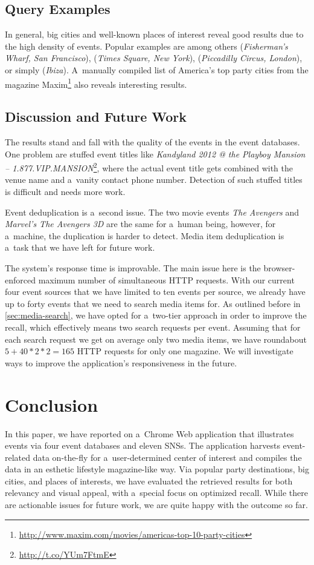 \documentclass{acm_proc_article-sp}
\let\oldemph\emph
\renewcommand{\emph}[1]{\oldemph{\fontsize{9}{9}\selectfont #1}}
\begin{document}
{\subsection{Query Examples}
In general, big cities and well-known places of interest
reveal good results due to the high density of events.
Popular examples are among others
(\emph{Fisherman's Wharf, San Francisco}),
(\emph{Times Square, New York}),
(\emph{Piccadilly Circus, London}),
or simply (\emph{Ibiza}).	
A~manually compiled list of America's top party cities
from the magazine Maxim\footnote{\url{http://www.maxim.com/movies/americas-top-10-party-cities}}
also reveals interesting results.

\subsection{Discussion and Future Work}
The results stand and fall with the quality of the events
in the event databases.
One problem are stuffed event titles like
\emph{Kandyland 2012 @ the Playboy Mansion -- 1.877.VIP.MANS\-ION}\footnote{\url{http://t.co/YUm7FtmE}},
where the actual event title gets combined with the venue name
and a~vanity contact phone number.
Detection of such stuffed titles is difficult and needs more work.

Event deduplication is a~second issue.
The two movie events \emph{The Avengers} and
\emph{Marvel's The Avengers 3D} are the same for a~human being,
however, for a~machine, the duplication is harder to detect.
Media item deduplication is a~task that we have left for future work.

The system's response time is improvable.
The main issue here is the browser-enforced maximum number
of simultaneous HTTP requests.
With our current four event sources that we have limited
to ten events per source, we already have up to forty events
that we need to search media items for.
As outlined before in \autoref{sec:media-search},
we have opted for a~two-tier approach in order to improve the recall,
which effectively means two search requests per event.
Assuming that for each search request we get on average only two media items,
we have roundabout $5+40*2*2=165$ HTTP requests for only one magazine.
We will investigate ways to improve the application's responsiveness
in the future.


\section{Conclusion}                                                        \label{sec:conclusion}
In this paper, we have reported on a~Chrome Web application that
illustrates events via four event databases and eleven SNSs.
The application harvests event-related data on-the-fly for
a~user-determined center of interest and compiles the data
in an esthetic lifestyle magazine-like way.
Via popular party destinations, big cities, and places of interests,
we have evaluated the retrieved results for both relevancy and
visual appeal, with a~special focus on optimized recall.
While there are actionable issues for future work,
we are quite happy with the outcome so far.

}
\end{document}
